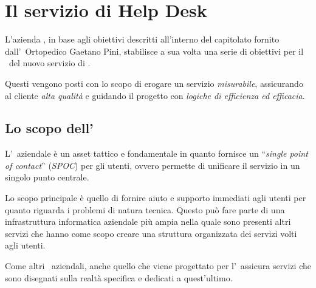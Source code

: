 \chapter{Il servizio di Help Desk}\label{ch:servizio_helpdesk}


	L'azienda \azienda, in base agli obiettivi descritti all'interno del capitolato fornito dall'\istituto~Ortopedico Gaetano Pini, stabilisce a sua volta una serie di obiettivi per il \rollout~del nuovo servizio di \helpdesk.
	
	Questi vengono posti con lo scopo di erogare un servizio \textit{misurabile}, assicurando al cliente \textit{alta qualità} e guidando il progetto con \textit{logiche di efficienza ed efficacia}.
	
\section{Lo scopo dell'\helpdesk}\label{sec:scopo_helpdesk}
	
	L'\helpdesk~aziendale è un asset tattico e fondamentale in quanto fornisce un ``\textit{single point of contact}'' (\textit{SPOC}) per gli utenti, ovvero permette di unificare il servizio in un singolo punto centrale.

	Lo scopo principale è quello di fornire aiuto e supporto immediati agli utenti per quanto riguarda i problemi di natura tecnica.
	Questo può fare parte di una infrastruttura informatica aziendale più ampia nella quale sono presenti altri servizi che hanno come scopo creare una struttura organizzata dei servizi volti agli utenti.
	
	Come altri \helpdesk~aziendali, anche quello che viene progettato per l'\istituto~assicura servizi che sono disegnati sulla realtà specifica e dedicati a quest'ultimo.
	
